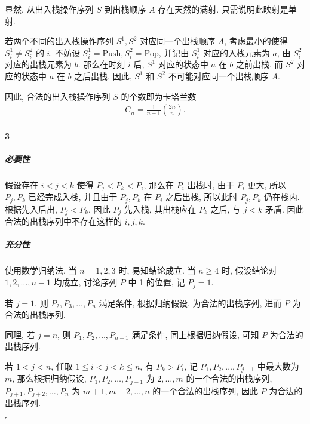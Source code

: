 \documentclass{ctexart}
\def\QED{\hfill $\square$}
\begin{document}
显然, 从出入栈操作序列 $S$ 到出栈顺序 $A$ 存在天然的满射.
只需说明此映射是单射.

若两个不同的出入栈操作序列 $S^1, S^2$ 对应同一个出栈顺序 $A$, 
考虑最小的使得 $S^1_i\ne S^2_i$ 的 $i$. 
不妨设 $S^1_i=\mathrm{Push}, S^2_i=\mathrm{Pop}$,
并记由 $S^1_i$ 对应的入栈元素为 $a$, 由 $S^2_i$ 对应的出栈元素为 $b$.
那么在时刻 $i$ 后, $S^1$ 对应的状态中 $a$ 在 $b$ 之前出栈, 
而 $S^2$ 对应的状态中 $a$ 在 $b$ 之后出栈.
因此, $S^1$ 和 $S^2$ 不可能对应同一个出栈顺序 $A$.

因此, 合法的出入栈操作序列 $S$ 的个数即为卡塔兰数
\begin{gather*}
    C_n = \frac{1}{n+1} \binom{2n}{n}.
\end{gather*}

\paragraph*{3} 

\subparagraph*{必要性} 假设存在 $i<j<k$ 使得 $P_j<P_k<P_i$, 
那么在 $P_i$ 出栈时, 由于 $P_i$ 更大, 所以 $P_j, P_k$ 已经完成入栈,
并且由于 $P_j, P_k$ 在 $P_i$ 之后出栈, 所以此时 $P_j, P_k$ 仍在栈内.
根据先入后出, $P_j<P_k$, 因此 $P_j$ 先入栈, 其出栈应在 $P_k$ 之后,
与 $j<k$ 矛盾. 因此合法的出栈序列中不存在这样的 $i, j, k$.

\subparagraph*{充分性} 使用数学归纳法. 当 $n=1,2,3$ 时, 易知结论成立.
当 $n\ge 4$ 时, 假设结论对 $1,2,\ldots,n-1$ 均成立,
讨论序列 $P$ 中 1 的位置, 记 $P_j=1$.

若 $j=1$, 则 $P_2, P_3, \ldots, P_n$ 满足条件, 根据归纳假设, 
为合法的出栈序列, 进而 $P$ 为合法的出栈序列.

同理, 若 $j=n$, 则 $P_1, P_2, \ldots, P_{n-1}$ 满足条件,
同上根据归纳假设, 可知 $P$ 为合法的出栈序列.

若 $1<j<n$, 任取 $1\le i < j < k \le n$, 有 $P_k > P_i$, 
记 $P_1, P_2, \ldots, P_{j-1}$ 中最大数为 $m$, 那么根据归纳假设,
$P_1, P_2, \ldots, P_{j-1}$ 为 $2,\ldots, m$ 的一个合法的出栈序列,
$P_{j+1}, P_{j+2}, \ldots, P_n$ 为 $m+1, m+2, \ldots, n$ 的一个合法的出栈序列,
因此 $P$ 为合法的出栈序列.

\QED
\end{document}

